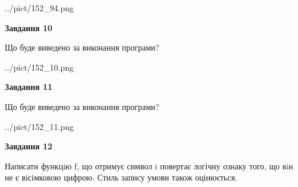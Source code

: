 \documentclass[12pt, ukrainian]{article}
\begin{document}
{\begin {large}
\begin{center}
	{../pict/152_94.png}
\end{center}
\newpage

{\begin {center}\textbf{Завдання 10}\end {center}}

Що буде виведено за виконання програми?\par
\begin{center}
	{../pict/152_10.png}
\end{center}
\newpage

{\begin {center}\textbf{Завдання 11}\end {center}}

Що буде виведено за виконання програми?\par
\begin{center}
	{../pict/152_11.png}
\end{center}
\newpage

{\begin {center}\textbf{Завдання 12}\end {center}}


Написати функцiю f, що отримує символ i повертає логічну ознаку того, що вiн не є вісімковою цифрою. Стиль запису умови також оцінюється.\par
\newpage

\end {large}}
\end{document}

